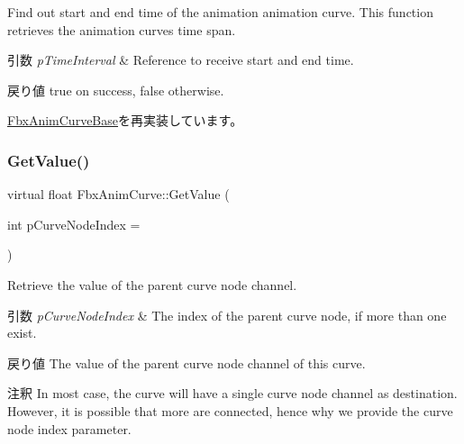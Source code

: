 Find out start and end time of the animation animation curve. This function retrieves the animation curve\textquotesingle{}s time span. 
\begin{DoxyParams}{引数}
{\em p\+Time\+Interval} & Reference to receive start and end time. \\
\hline
\end{DoxyParams}
\begin{DoxyReturn}{戻り値}
{\ttfamily true} on success, {\ttfamily false} otherwise. 
\end{DoxyReturn}


\hyperlink{class_fbx_anim_curve_base_a4d259319e514c5371ff184b0cc7f7cd6}{Fbx\+Anim\+Curve\+Base}を再実装しています。

\mbox{\label{class_fbx_anim_curve_ada5c523e08c9a1e4407dfce8697babdc}} 
\subsubsection{\texorpdfstring{Get\+Value()}{GetValue()}}
{\footnotesize\ttfamily virtual float Fbx\+Anim\+Curve\+::\+Get\+Value (\begin{DoxyParamCaption}\item[{int}]{p\+Curve\+Node\+Index = {} }\end{DoxyParamCaption})\hspace{0.3cm}{\ttfamily [pure virtual]}}

Retrieve the value of the parent curve node channel. 
\begin{DoxyParams}{引数}
{\em p\+Curve\+Node\+Index} & The index of the parent curve node, if more than one exist. \\
\hline
\end{DoxyParams}
\begin{DoxyReturn}{戻り値}
The value of the parent curve node channel of this curve. 
\end{DoxyReturn}
\begin{DoxyRemark}{注釈}
In most case, the curve will have a single curve node channel as destination. However, it is possible that more are connected, hence why we provide the curve node index parameter. 
\end{DoxyRemark}
\mbox{\label{class_fbx_anim_curve_aefac9bf8a5d7bf1fe147e192ba503737}} 
